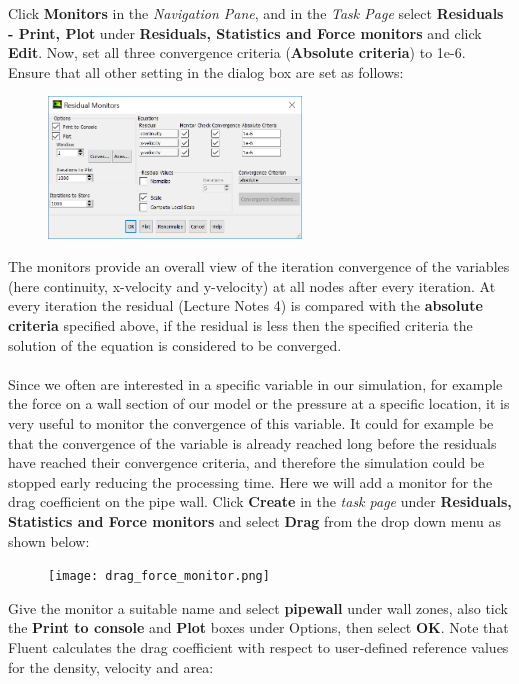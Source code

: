 \documentclass[11pt,a4paper,oneside]{scrartcl}
\newcommand\bfr[1]{\textcolor[rgb]{1,0.00,0.00}{\textbf{\textsf{#1}}}}
\begin{document}
Click \bfr{Monitors} in the \emph{Navigation Pane}, and in the \emph{Task Page} select \bfr{Residuals - Print, Plot} under \bfr{Residuals, Statistics and Force monitors} and click \bfr{Edit}. Now, set all three convergence criteria (\bfr{Absolute criteria}) to 1e-6. Ensure that all other setting in the dialog box are set as follows:
\begin{figure}[H]
\begin{center}
\includegraphics[width=0.6\textwidth,clip]{convergence_criteria.png}
\end{center}
\end{figure}
The monitors provide an overall view of the iteration convergence of the variables (here continuity, x-velocity and y-velocity) at all nodes after every iteration. At every iteration the residual (Lecture Notes 4) is compared with the \bfr{absolute criteria} specified above, if the residual is less then the specified criteria the solution of the equation is considered to be converged.
\\
\\
Since we often are interested in a specific variable in our simulation, for example the force on a wall section of our model or the pressure at a specific location, it is very useful to monitor the convergence of this variable. It could for example be that the convergence of the variable is already reached long before the residuals have reached their convergence criteria, and therefore the simulation could be stopped early reducing the processing time. Here we will add a monitor for the drag coefficient on the pipe wall. Click \bfr{Create} in the \emph{task page} under \bfr{Residuals, Statistics and Force monitors} and select \bfr{Drag} from the drop down menu as shown below:
\begin{figure}[H]
\begin{center}
\texttt{[image: drag\_force\_monitor.png]}
\end{center}
\end{figure}
Give the monitor a suitable name and select \bfr{pipewall} under wall zones, also tick the \bfr{Print to console} and \bfr{Plot} boxes under Options, then select \bfr{OK}.  Note that Fluent calculates the drag coefficient with respect to user-defined reference values for the density, velocity and area:
\end{document}
